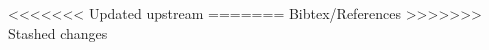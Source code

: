 
\usepackage{booktabs} %

%
\cleardoublepage
\cleardoublepage

\cleardoublepage
\tableofcontents


\listoffixmes



%













<<<<<<< Updated upstream
\printbibliography
=======
{Bibtex/References}\label{lastpage}
>>>>>>> Stashed changes



